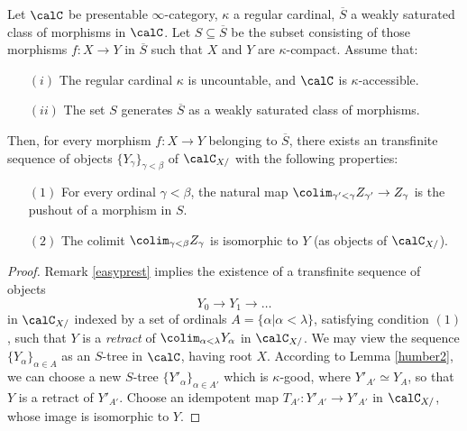 \begin{CategoryTheory}
\begin{Didn't Read}
\begin{proposition}\label{easycrust}
Let $\calC$ be presentable $\infty$-category, $\kappa$ a regular cardinal, $\overline{S}$ a weakly saturated class of morphisms in $\calC$. Let $S \subseteq \overline{S}$ be the subset consisting of those morphisms $f: X \rightarrow Y$ in $\overline{S}$ such that $X$ and $Y$ are $\kappa$-compact. Assume that:
\begin{itemize}
\item[$(i)$] The regular cardinal $\kappa$ is uncountable, and $\calC$ is $\kappa$-accessible.
\item[$(ii)$] The set $S$ generates $\overline{S}$ as a weakly saturated class of morphisms.
\end{itemize}
Then, for every morphism $f: X \rightarrow Y$ belonging to $\overline{S}$, there
exists an transfinite sequence of objects $\{ Y_{\gamma} \}_{\gamma < \beta}$ of
$\calC_{X/}$ with the following properties:
\begin{itemize}
\item[$(1)$] For every ordinal $\gamma < \beta$, the natural map
$\colim_{\gamma' < \gamma} Z_{\gamma'} \rightarrow Z_{\gamma}$ is the pushout of a morphism in  $S$.
\item[$(2)$] The colimit $\colim_{\gamma < \beta} Z_{\gamma}$ is isomorphic to $Y$
(as objects of $\calC_{X/}$). 
\end{itemize}
\end{proposition}

\begin{proof}
Remark \ref{easyprest} implies the existence of a transfinite sequence of objects
$$ Y_0 \rightarrow Y_1 \rightarrow \ldots $$
in $\calC_{X/}$ indexed by a set of ordinals $A = \{ \alpha | \alpha < \lambda \}$, 
satisfying condition $(1)$, such that
$Y$ is a {\em retract} of $\colim_{\alpha < \lambda} Y_{\alpha}$ in $\calC_{X/}$. We may view
the sequence $\{ Y_{\alpha} \}_{ \alpha \in A}$ as an $S$-tree in $\calC$, having root $X$. According to Lemma \ref{humber2}, we can choose a new $S$-tree $\{ Y'_{\alpha} \}_{ \alpha \in A'}$
which is $\kappa$-good, where $Y'_{A'} \simeq Y_A$, so that $Y$ is a retract of
$Y'_{A'}$. Choose an idempotent map $T_{A'}: Y'_{A'} \rightarrow Y'_{A'}$ in $\calC_{X/}$, whose
image is isomorphic to $Y$.


\end{proof}
\end{Didn't Read}
\end{CategoryTheory}
